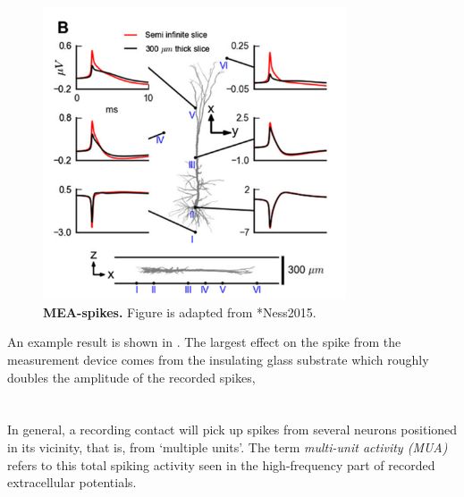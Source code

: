 \begin{figure}[!ht]
\begin{center}
\includegraphics[width=0.8\textwidth]{Figures/Spikes/Spikes-MEA-2-w43-r300}
\end{center}
\caption[]{\textbf{MEA-spikes.}
Figure is adapted from \citeasnoun**{Ness2015}.}
\label{fig:Spikes:MEA-spikes}
\end{figure}

An example result is shown in . 
The largest effect on the spike from the measurement device comes from the insulating glass substrate 
which roughly doubles the amplitude of the recorded spikes, 


\section{}
In general, a recording contact will pick up spikes from several neurons positioned in its vicinity, 
that is, from `multiple units'. The term \emph{multi-unit activity (MUA)} refers to this total spiking activity seen 
in the high-frequency part of recorded extracellular potentials. 

